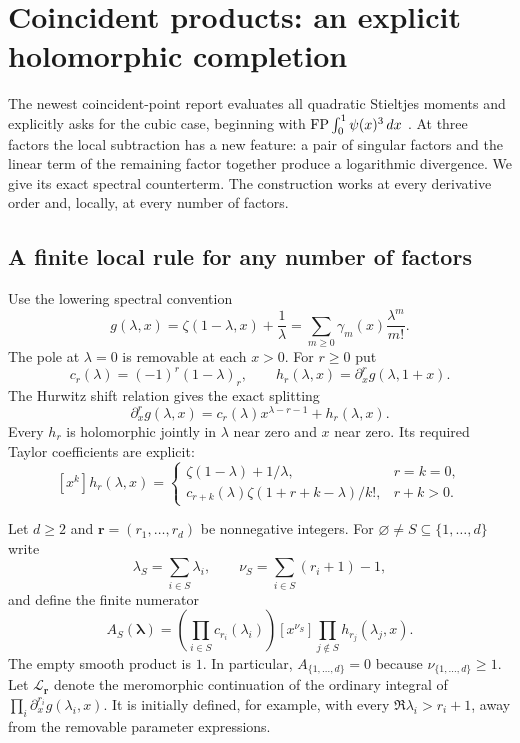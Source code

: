 \section{Coincident products: an explicit holomorphic completion}
\label{cub:sec}

The newest coincident-point report evaluates all quadratic Stieltjes
moments and explicitly asks for the cubic case, beginning with
$\operatorname*{FP}\int_0^1\psi(x)^3\,dx$ \cite{IncomingCoincident}.
At three factors the local subtraction has a new feature: a pair of
singular factors and the linear term of the remaining factor together
produce a logarithmic divergence.  We give its exact spectral
counterterm.  The construction works at every derivative order and,
locally, at every number of factors.

\subsection{A finite local rule for any number of factors}

Use the lowering spectral convention
\begin{equation}\label{cub:generator}
 g(\lambda,x)=\zeta(1-\lambda,x)+\frac1\lambda
   =\sum_{m\ge0}\gamma_m(x)\frac{\lambda^m}{m!}.
\end{equation}
The pole at $\lambda=0$ is removable at each $x>0$.
For $r\ge0$ put
\[
 c_r(\lambda)=(-1)^r(1-\lambda)_r,
 \qquad h_r(\lambda,x)=\partial_x^r g(\lambda,1+x).
\]
The Hurwitz shift relation gives the exact splitting
\begin{equation}\label{cub:local-split}
 \partial_x^r g(\lambda,x)
 =c_r(\lambda)x^{\lambda-r-1}+h_r(\lambda,x).
\end{equation}
Every $h_r$ is holomorphic jointly in $\lambda$ near zero and $x$ near
zero.  Its required Taylor coefficients are explicit:
\begin{equation}\label{cub:h-coefficients}
 [x^k]h_r(\lambda,x)=
 \begin{cases}
 \zeta(1-\lambda)+1/\lambda,&r=k=0,\\[2pt]
 c_{r+k}(\lambda)\zeta(1+r+k-\lambda)/k!,&r+k>0.
 \end{cases}
\end{equation}

Let $d\ge2$ and $\boldsymbol r=(r_1,\ldots,r_d)$ be nonnegative
integers.  For $\varnothing\ne S\subseteq\{1,\ldots,d\}$ write
\[
 \lambda_S=\sum_{i\in S}\lambda_i,
 \qquad \nu_S=\sum_{i\in S}(r_i+1)-1,
\]
and define the finite numerator
\begin{equation}\label{cub:subset-numerator}
 A_S(\boldsymbol\lambda)=
 \left(\prod_{i\in S}c_{r_i}(\lambda_i)\right)
 [x^{\nu_S}]\prod_{j\notin S}h_{r_j}(\lambda_j,x).
\end{equation}
The empty smooth product is $1$.  In particular, $A_{\{1,\ldots,d\}}=0$
because $\nu_{\{1,\ldots,d\}}\ge1$.
Let $\mathcal L_{\boldsymbol r}$ denote the meromorphic continuation
of the ordinary integral of $\prod_i\partial_x^{r_i}g(\lambda_i,x)$.
It is initially defined, for example, with every
$\Re\lambda_i>r_i+1$, away from the removable parameter expressions.

